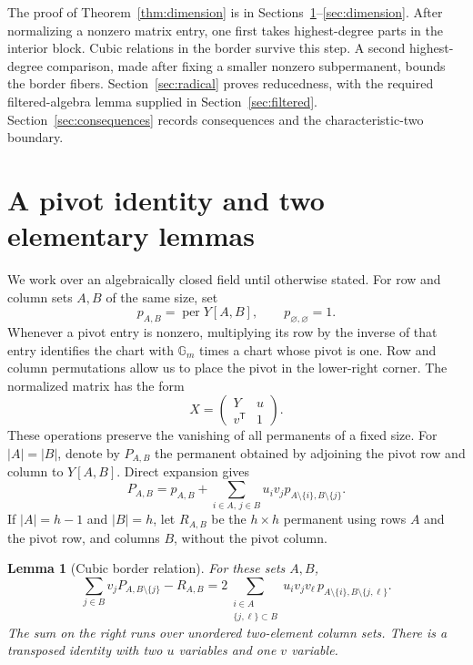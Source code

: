 \documentclass[11pt]{article}
\newtheorem{lemma}[theorem]{Lemma}
\theoremstyle{remark}
\DeclareMathOperator{\per}{per}
\newcommand{\Gm}{\mathbb G_m}
\newcommand{\smallset}[2]{#1\setminus\{#2\}}
\numberwithin{equation}{section}
\begin{document}
The proof of Theorem~\ref{thm:dimension} is in
Sections~\ref{sec:pivot}--\ref{sec:dimension}. After normalizing a
nonzero matrix entry, one first takes highest-degree parts in the
interior block. Cubic relations in the border survive this step.
A second highest-degree comparison, made after fixing a smaller
nonzero subpermanent, bounds the border fibers. Section~\ref{sec:radical}
proves reducedness, with the required filtered-algebra lemma supplied
in Section~\ref{sec:filtered}. Section~\ref{sec:consequences} records
consequences and the characteristic-two boundary.

\section{A pivot identity and two elementary lemmas}\label{sec:pivot}

We work over an algebraically closed field until otherwise stated.
For row and column sets $A,B$ of the same size, set
\[
 p_{A,B}=\per Y[A,B],\qquad p_{\varnothing,\varnothing}=1.
\]
Whenever a pivot entry is nonzero, multiplying its row by the inverse
of that entry identifies the chart with $\Gm$ times a chart whose
pivot is one. Row and column permutations allow us to place the pivot
in the lower-right corner. The normalized matrix has the form
\begin{equation}\label{eq:pivot-matrix}
 X=\begin{pmatrix}Y&u\\ v^{\mathsf T}&1\end{pmatrix}.
\end{equation}
These operations preserve the vanishing of all permanents of a fixed
size. For $|A|=|B|$, denote by $P_{A,B}$ the permanent obtained by
adjoining the pivot row and column to $Y[A,B]$. Direct expansion gives
\begin{equation}\label{eq:border}
 P_{A,B}=p_{A,B}
   +\sum_{i\in A,\,j\in B}u_i v_j
                  p_{\smallset A i,\smallset B j}.
\end{equation}
If $|A|=h-1$ and $|B|=h$, let $R_{A,B}$ be the $h\times h$
permanent using rows $A$ and the pivot row, and columns $B$, without
the pivot column.

\begin{lemma}[Cubic border relation]\label{lem:cubic}
For these sets $A,B$,
\begin{equation}\label{eq:cubic-identity}
 \sum_{j\in B}v_jP_{A,\smallset B j}-R_{A,B}
 =2\sum_{\substack{i\in A\\ \{j,\ell\}\subset B}}
       u_i v_jv_\ell\,
       p_{\smallset A i,B\setminus\{j,\ell\}}.
\end{equation}
The sum on the right runs over unordered two-element column sets.
There is a transposed identity with two $u$ variables and one $v$
variable.
\end{lemma}
\end{document}
